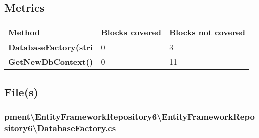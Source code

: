 \documentclass[a4paper,10pt]{article}
\begin{document}
\subsection{Metrics}
\begin{longtable}[l]{|l|l|l|}
\hline
\textbf{Method} & \textbf{Blocks covered} & \textbf{Blocks not covered}\\
\hline
\textbf{DatabaseFactory(stri} & 0 & 3\\
\hline
\textbf{GetNewDbContext()} & 0 & 11\\
\hline
\end{longtable}
\subsection{File(s)}
\subsubsection{pment\textbackslash EntityFrameworkRepository6\textbackslash EntityFrameworkRepository6\textbackslash DatabaseFactory.cs}
\end{document}
